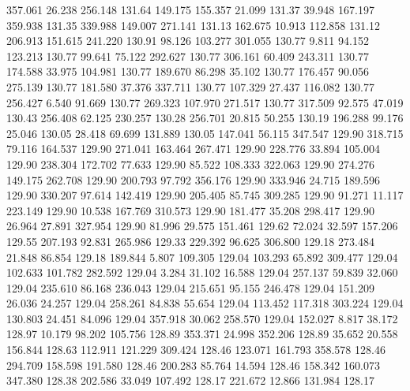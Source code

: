  357.061   26.238  256.148       131.64
 149.175  155.357   21.099       131.37
  39.948  167.197  359.938       131.35
 339.988  149.007  271.141       131.13
 162.675   10.913  112.858       131.12
 206.913  151.615  241.220       130.91
  98.126  103.277  301.055       130.77
   9.811   94.152  123.213       130.77
  99.641   75.122  292.627       130.77
 306.161   60.409  243.311       130.77
 174.588   33.975  104.981       130.77
 189.670   86.298   35.102       130.77
 176.457   90.056  275.139       130.77
 181.580   37.376  337.711       130.77
 107.329   27.437  116.082       130.77
 256.427    6.540   91.669       130.77
 269.323  107.970  271.517       130.77
 317.509   92.575   47.019       130.43
 256.408   62.125  230.257       130.28
 256.701   20.815   50.255       130.19
 196.288   99.176   25.046       130.05
  28.418   69.699  131.889       130.05
 147.041   56.115  347.547       129.90
 318.715   79.116  164.537       129.90
 271.041  163.464  267.471       129.90
 228.776   33.894  105.004       129.90
 238.304  172.702   77.633       129.90
  85.522  108.333  322.063       129.90
 274.276  149.175  262.708       129.90
 200.793   97.792  356.176       129.90
 333.946   24.715  189.596       129.90
 330.207   97.614  142.419       129.90
 205.405   85.745  309.285       129.90
  91.271   11.117  223.149       129.90
  10.538  167.769  310.573       129.90
 181.477   35.208  298.417       129.90
  26.964   27.891  327.954       129.90
  81.996   29.575  151.461       129.62
  72.024   32.597  157.206       129.55
 207.193   92.831  265.986       129.33
 229.392   96.625  306.800       129.18
 273.484   21.848   86.854       129.18
 189.844    5.807  109.305       129.04
 103.293   65.892  309.477       129.04
 102.633  101.782  282.592       129.04
   3.284   31.102   16.588       129.04
 257.137   59.839   32.060       129.04
 235.610   86.168  236.043       129.04
 215.651   95.155  246.478       129.04
 151.209   26.036   24.257       129.04
 258.261   84.838   55.654       129.04
 113.452  117.318  303.224       129.04
 130.803   24.451   84.096       129.04
 357.918   30.062  258.570       129.04
 152.027    8.817   38.172       128.97
  10.179   98.202  105.756       128.89
 353.371   24.998  352.206       128.89
  35.652   20.558  156.844       128.63
 112.911  121.229  309.424       128.46
 123.071  161.793  358.578       128.46
 294.709  158.598  191.580       128.46
 200.283   85.764   14.594       128.46
 158.342  160.073  347.380       128.38
 202.586   33.049  107.492       128.17
 221.672   12.866  131.984       128.17
